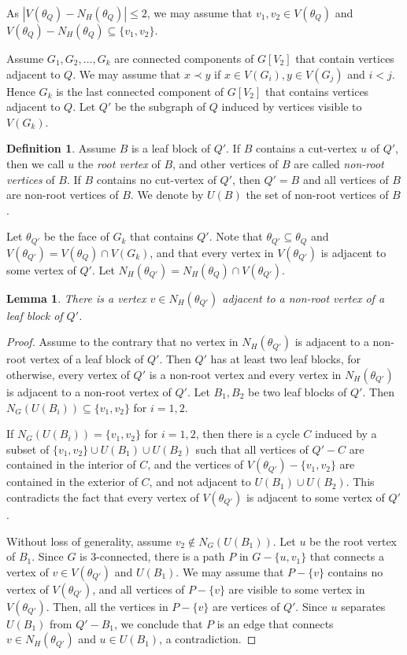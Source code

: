 \documentclass[11pt,a4paper]{article}
\newtheorem{lem}{Lemma}
\theoremstyle{definition}
\newtheorem{definition}{Definition}
\begin{document}
As $|V(\theta_Q) - N_H(\theta_Q)| \le 2$, we may assume that $v_1,v_2 \in V(\theta_Q)$ and $V(\theta_Q) - N_H(\theta_Q) \subseteq \{v_1, v_2\}$.


Assume $G_1, G_2, \ldots, G_k$ are connected components of $G[V_2]$ that contain vertices adjacent to $Q$.  
We may assume that $x \prec y$ if $x \in V(G_i), y \in V(G_j)$ and $i < j$. Hence $G_k$ is the last connected component of $G[V_2]$ that contains vertices adjacent to $Q$. Let $Q'$ be the subgraph of $Q$ induced by vertices visible to $V(G_k)$.  

\begin{definition}
    \label{def-leaf}
    Assume $B$ is a leaf block of $Q'$. If  $B$ contains a cut-vertex $u$ of $Q'$, then we call $u$ the {\em root vertex} of $B$, and other vertices of $B$ are called {\em non-root vertices} of $B$.  If $B$ contains no cut-vertex of $Q'$, then $Q'=B$ and all vertices of $B$ are non-root vertices of $B$. We denote by $U(B)$ the set of non-root vertices of $B$.
\end{definition}


Let $\theta_{Q'}$ be the face of $G_k$ that contains $Q'$. Note that $\theta_{Q'} \subseteq \theta_{Q}$ and $V(\theta_{Q'}) = V(\theta_Q) \cap V(G_k)$, and that every vertex in $V(\theta_{Q'})$ is adjacent to some vertex of $Q'$. Let $N_H(\theta_{Q'}) = N_H(\theta_{Q}) \cap V(\theta_{Q'})$. 

\begin{lem}
    \label{lem-three}
    There is a vertex $v \in N_H(\theta_{Q'})$ adjacent to a non-root vertex of a leaf block of $Q'$.  
\end{lem}
\begin{proof}  
    Assume to the contrary that no vertex in $N_H(\theta_{Q'}) $ is adjacent to a non-root vertex of a leaf block of $Q'$. Then $Q'$ has at least two leaf blocks, for otherwise, every vertex of $Q'$ is a non-root vertex and  every vertex in $N_H(\theta_{Q'})$ is adjacent to a non-root vertex of $Q'$. Let   $B_1,B_2$ be two leaf blocks of $Q'$. Then $N_G(U(B_i)) \subseteq \{v_1, v_2\}$ for $i=1,2$. 
    
    If $N_G(U(B_i)) = \{v_1, v_2\}$ for $i=1,2$, then
there is a cycle $C$ induced by a subset of $\{v_1,v_2\} \cup U(B_1) \cup U(B_2)$  such that all vertices of $Q'-C$ are contained in the interior of $C$, and the vertices of $V(\theta_{Q'})-\{v_1,v_2\}$ are contained in the exterior of $C$, and not adjacent to $U(B_1) \cup U(B_2)$. This contradicts the fact that every vertex of $V(\theta_{Q'})$ is adjacent to some vertex of $Q'$.   

    Without loss of generality, assume $v_2 \notin N_G(U(B_1))$. 
  Let $u$ be the root vertex of $B_1$. Since $G$ is 3-connected, there is a path $P$ in $G-\{u,v_1\}$ that connects a vertex of $v \in V(\theta_{Q'})$ and $U(B_1)$. We may assume that $P-\{v\}$ contains no vertex of $V(\theta_{Q'})$, and all vertices of $P-\{v\}$ are visible to some vertex in $V(\theta_{Q'})$.
  Then, all the vertices in $P-\{v\}$ are vertices of $Q'$. Since $u$ separates $U(B_1)$ from $Q'-B_1$, we conclude that $P$ is an edge that connects $v \in N_{H}(\theta_{Q'})$ and $u\in U(B_1)$, a contradiction.  
\end{proof}
\end{document}
